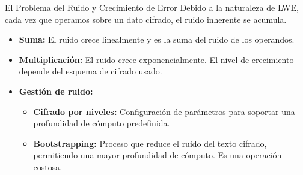 \begin{frame}{El Problema del Ruido y Crecimiento de Error}
    Debido a la naturaleza de LWE, cada vez que operamos sobre un dato cifrado, el ruido inherente se acumula. 
    \vspace{0.3cm}
    \begin{itemize}
        \setlength{\itemsep}{12pt}
        \item \textbf{Suma:} El ruido crece linealmente y es la suma del ruido de los operandos.
        \item \textbf{Multiplicación:} El ruido crece exponencialmente. El nivel de crecimiento depende del esquema de cifrado usado.
        \item \textbf{Gestión de ruido:}
        \begin{itemize}
            \setlength{\itemsep}{8pt}
            \item \textbf{Cifrado por niveles:} Configuración de parámetros para soportar una profundidad de cómputo predefinida.
            \item \textbf{Bootstrapping:} Proceso que reduce el ruido del texto cifrado, permitiendo una mayor profundidad de cómputo. Es una operación costosa.
        \end{itemize}
    \end{itemize}
\end{frame}
